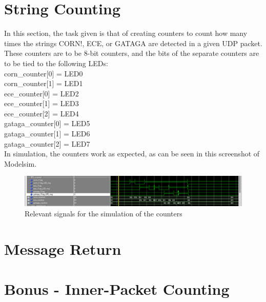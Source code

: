 \documentclass{article}
\begin{document}
\section{String Counting}
In this section, the task given is that of creating counters to count how many times the strings CORN!, ECE, or GATAGA are detected in a given UDP packet. These counters are to be 8-bit counters, and the bits of the separate counters are to be tied to the following LEDs:\\

corn\_counter[0] = LED0\\
corn\_counter[1] = LED1\\
ece\_counter[0] = LED2\\
ece\_counter[1] = LED3\\
ece\_counter[2] = LED4\\
gataga\_counter[0] = LED5\\
gataga\_counter[1] = LED6\\
gataga\_counter[2] = LED7\\

In simulation, the counters work as expected, as can be seen in this screenshot of Modelsim.
	\begin{figure}[h]
		\begin{center}
			\includegraphics[scale=0.35]{../part4_files/String_counter_sim.png}
			\caption{Relevant signals for the simulation of the counters}
		\end{center}
	\end{figure}

\section{Message Return}



\section{Bonus - Inner-Packet Counting}








\end{document}
